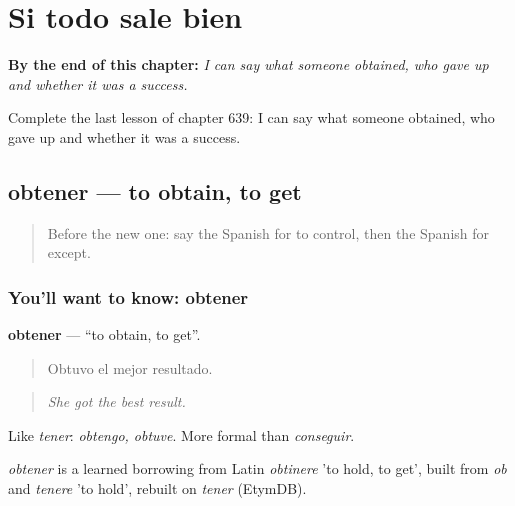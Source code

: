 
\chapter{Si todo sale bien}
\label{ch:es-si-todo-sale-bien}

\begin{chapteropening}
\textbf{By the end of this chapter:} \emph{I can say what someone obtained, who gave up and whether it was a success.}

Complete the last lesson of chapter 639: I can say what someone obtained, who gave up and whether it was a success.
\end{chapteropening}

\section[obtener]{obtener — to obtain, to get}

\label{lesson:ES-C639-obtener}



\begin{quote}
Before the new one: say the Spanish for to control, then the Spanish for except.
\end{quote}

\subsection*{You'll want to know: obtener}
\textbf{obtener} — \textquotedblleft{}to obtain, to get\textquotedblright{}.

\begin{quote}
Obtuvo el mejor resultado.
\end{quote}

\begin{quote}
\emph{She got the best result.}
\end{quote}

Like \emph{tener}: \emph{obtengo, obtuve}. More formal than \emph{conseguir}.

\begin{cousinweb}
\emph{obtener} is a learned borrowing from Latin \emph{obtinere} 'to hold, to get', built from \emph{ob} and \emph{tenere} 'to hold', rebuilt on \emph{tener} (EtymDB).
\end{cousinweb}

